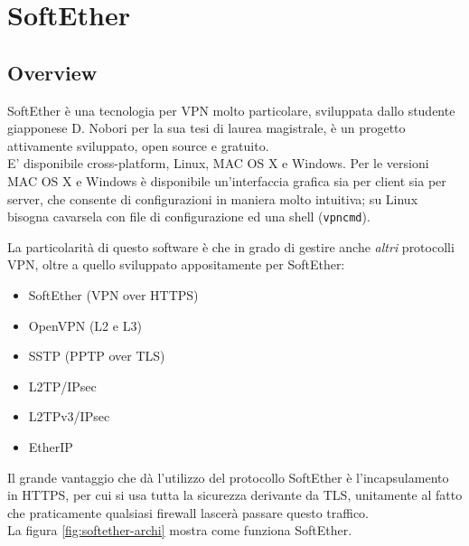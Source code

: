 \section{SoftEther}
\subsection{Overview}
SoftEther \cite{softether} è una tecnologia per VPN molto particolare, sviluppata dallo studente
giapponese D. Nobori per la sua tesi di laurea magistrale,
è un progetto
attivamente sviluppato, open source e gratuito.\\
E' disponibile cross-platform, Linux, MAC OS X e Windows. Per
le versioni MAC OS X e Windows è disponibile un'interfaccia grafica sia per client
sia per server, che consente di configurazioni in maniera molto intuitiva; su Linux
bisogna cavarsela con file di configurazione ed una shell (\texttt{vpncmd}).


La particolarità di questo software è che in grado di gestire anche \textit{altri}
protocolli VPN, oltre a quello sviluppato appositamente per SoftEther:
\begin{itemize}
  \item SoftEther (VPN over HTTPS)
  \item OpenVPN (L2  e L3)
  \item SSTP (PPTP over TLS)
  \item L2TP/IPsec
  \item L2TPv3/IPsec
  \item EtherIP
\end{itemize}
Il grande vantaggio che dà l'utilizzo del protocollo SoftEther è l'incapsulamento in
HTTPS, per cui si usa tutta la sicurezza derivante da TLS, unitamente al fatto che
praticamente qualsiasi firewall lascerà passare questo traffico.\\
La figura \ref{fig:softether-archi} mostra come funziona SoftEther.


